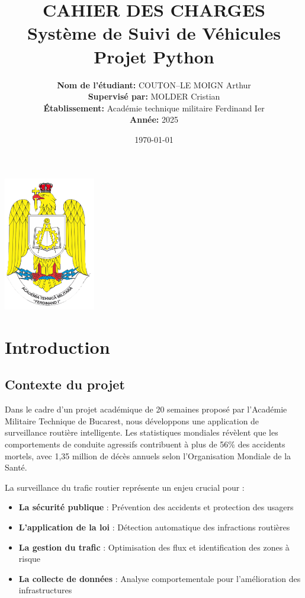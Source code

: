 \documentclass[12pt,a4paper]{article}
\title{
    \vspace{-2cm}
    \Huge\textbf{CAHIER DES CHARGES}\\
    \vspace{0.5cm}
    \Large Système de Suivi de Véhicules\\
    \vspace{0.3cm}
    \large Projet Python
}
\author{
    \textbf{Nom de l'étudiant:} COUTON--LE MOIGN Arthur\\
    \textbf{Supervisé par:} MOLDER Cristian\\
    \textbf{Établissement:} Académie technique militaire Ferdinand Ier\\
    \textbf{Année:} 2025
}
\date{\today}
\begin{document}
\maketitle
\thispagestyle{empty}

\vfill

\begin{center}
    \includegraphics[width=0.3\textwidth]{logo_etablissement.png} %
\end{center}

\vfill

\newpage

\tableofcontents
\newpage

\section{Introduction}

\subsection{Contexte du projet}

Dans le cadre d'un projet académique de 20 semaines proposé par l'Académie Militaire Technique de Bucarest, nous développons une application de surveillance routière intelligente. Les statistiques mondiales révèlent que les comportements de conduite agressifs contribuent à plus de 56\% des accidents mortels, avec 1,35 million de décès annuels selon l'Organisation Mondiale de la Santé.

La surveillance du trafic routier représente un enjeu crucial pour :

\begin{itemize}
    \item \textbf{La sécurité publique} : Prévention des accidents et protection des usagers
    \item \textbf{L'application de la loi} : Détection automatique des infractions routières
    \item \textbf{La gestion du trafic} : Optimisation des flux et identification des zones à risque
    \item \textbf{La collecte de données} : Analyse comportementale pour l'amélioration des infrastructures
\end{itemize}
\end{document}
